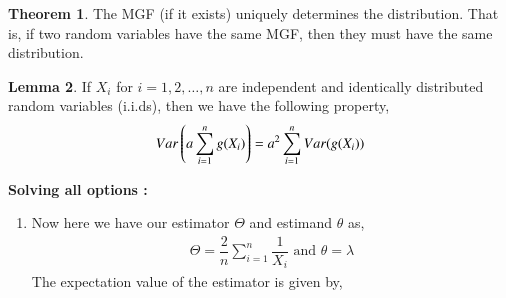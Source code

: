 \documentclass[journal,12pt,twocolumn]{IEEEtran}
\theoremstyle{definition}
\newtheorem{theorem}{Theorem}[section]
\newtheorem{lemma}[theorem]{Lemma}
\begin{document}
\begin{theorem}
\label{mgf}
 The MGF (if it exists) uniquely determines the distribution. That is, if two random variables have the same MGF, then they must have the same distribution. 
\end{theorem}
\begin{lemma}
\label{var}
If $X_{i}$ for $i = 1,2,\dots,n$ are independent and identically distributed random variables (i.i.ds), then we have the following property, 
   \begin{align}
    Var\left(a\sum_{i=1}^{n}g(X_{i})\right)=a^2 \sum_{i=1}^{n}Var(g(X_{i}))\label{basic}
    \end{align}
\end{lemma}
\textbf{Solving all options : }
\begin{enumerate}
    \item 
  Now here we have our estimator $ \Theta$ and estimand $ \theta $ as,
 \begin{align}
     \Theta = \dfrac{2}{n} \sum_{i=1}^{n} \dfrac{1}{X_i} \text{  and  }
     \theta = \lambda
 \end{align}
The expectation value of the estimator is given by, 


\end{enumerate}
\end{document}
